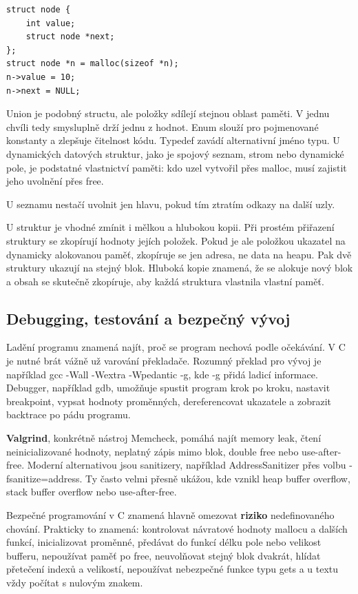 \begin{codebox}
\small
\begin{verbatim}
struct node {
    int value;
    struct node *next;
};
struct node *n = malloc(sizeof *n);
n->value = 10;
n->next = NULL;
\end{verbatim}
\end{codebox}

Union je podobný structu, ale položky sdílejí stejnou oblast paměti. V jednu chvíli tedy smysluplně drží jednu z hodnot. Enum slouží pro pojmenované konstanty a zlepšuje čitelnost kódu. Typedef zavádí alternativní jméno typu. U dynamických datových struktur, jako je spojový seznam, strom nebo dynamické pole, je podstatné vlastnictví paměti: kdo uzel vytvořil přes malloc, musí zajistit jeho uvolnění přes free.

U seznamu nestačí uvolnit jen hlavu, pokud tím ztratím odkazy na další uzly.

U struktur je vhodné zmínit i mělkou a hlubokou kopii. Při prostém přiřazení struktury se zkopírují hodnoty jejích položek. Pokud je ale položkou ukazatel na dynamicky alokovanou paměť, zkopíruje se jen adresa, ne data na heapu. Pak dvě struktury ukazují na stejný blok. Hluboká kopie znamená, že se alokuje nový blok a obsah se skutečně zkopíruje, aby každá struktura vlastnila vlastní paměť.

\subsection*{Debugging, testování a bezpečný vývoj}

Ladění programu znamená najít, proč se program nechová podle očekávání. V C je nutné brát vážně už varování překladače. Rozumný překlad pro vývoj je například gcc -Wall -Wextra -Wpedantic -g, kde -g přidá ladicí informace. Debugger, například gdb, umožňuje spustit program krok po kroku, nastavit breakpoint, vypsat hodnoty proměnných, dereferencovat ukazatele a zobrazit backtrace po pádu programu.

\textbf{Valgrind}, konkrétně nástroj Memcheck, pomáhá najít memory leak, čtení neinicializované hodnoty, neplatný zápis mimo blok, double free nebo use-after-free. Moderní alternativou jsou sanitizery, například AddressSanitizer přes volbu -fsanitize=address. Ty často velmi přesně ukážou, kde vznikl heap buffer overflow, stack buffer overflow nebo use-after-free.

Bezpečné programování v C znamená hlavně omezovat \textbf{riziko} nedefinovaného chování. Prakticky to znamená: kontrolovat návratové hodnoty mallocu a dalších funkcí, inicializovat proměnné, předávat do funkcí délku pole nebo velikost bufferu, nepoužívat paměť po free, neuvolňovat stejný blok dvakrát, hlídat přetečení indexů a velikostí, nepoužívat nebezpečné funkce typu gets a u textu vždy počítat s nulovým znakem.


